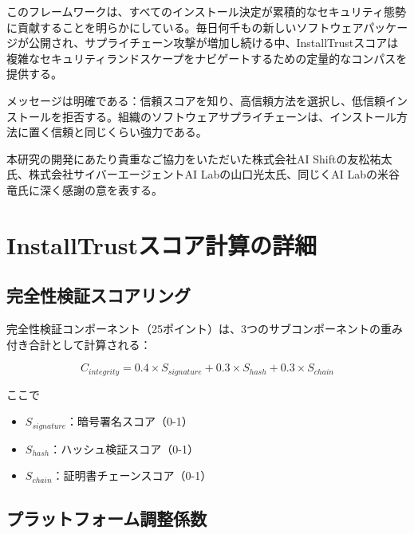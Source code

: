 \documentclass[Specialissue]{jsaiart}
\begin{document}
このフレームワークは、すべてのインストール決定が累積的なセキュリティ態勢に貢献することを明らかにしている。毎日何千もの新しいソフトウェアパッケージが公開され、サプライチェーン攻撃が増加し続ける中、InstallTrustスコアは複雑なセキュリティランドスケープをナビゲートするための定量的なコンパスを提供する。

メッセージは明確である：信頼スコアを知り、高信頼方法を選択し、低信頼インストールを拒否する。組織のソフトウェアサプライチェーンは、インストール方法に置く信頼と同じくらい強力である。

\newpage

\begin{acknowledgment}
本研究の開発にあたり貴重なご協力をいただいた株式会社AI Shiftの友松祐太氏、株式会社サイバーエージェントAI Labの山口光太氏、同じくAI Labの米谷竜氏に深く感謝の意を表する。
\end{acknowledgment}


\renewcommand*{\bibfont}{\fontsize{5.6}{5}\selectfont}
\printbibliography

\appendix

\section{InstallTrustスコア計算の詳細}

\subsection{完全性検証スコアリング}

完全性検証コンポーネント（25ポイント）は、3つのサブコンポーネントの重み付き合計として計算される：

\begin{equation}
C_{integrity} = 0.4 \times S_{signature} + 0.3 \times S_{hash} + 0.3 \times S_{chain}
\end{equation}

ここで
\begin{itemize}
    \item $S_{signature}$：暗号署名スコア（0-1）
    \item $S_{hash}$：ハッシュ検証スコア（0-1）
    \item $S_{chain}$：証明書チェーンスコア（0-1）
\end{itemize}

\subsection{プラットフォーム調整係数}
\end{document}
